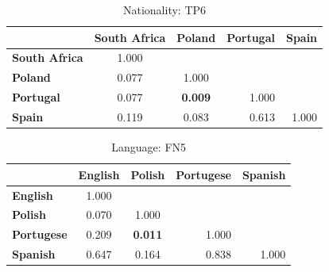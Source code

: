 \begin{table}
    \small
    \centering
    \begin{tabular}{lcccc}
        \toprule
                              & \multicolumn{1}{l}{\textbf{South Africa}} & \multicolumn{1}{l}{\textbf{Poland}}    & \textbf{Portugal}         & \textbf{Spain}            \\
        \midrule
        \textbf{South Africa} & 1.000                                     & \multicolumn{1}{l}{}                   &                           &                           \\
        \textbf{Poland}       & 0.077                                     & 1.000                                  &                           &                           \\
        \textbf{Portugal}     & 0.077                                     & \cellcolor[HTML]{EFEFEF}\textbf{0.009} & \multicolumn{1}{r}{1.000} &                           \\
        \textbf{Spain}        & 0.119                                     & 0.083                                  & \multicolumn{1}{r}{0.613} & \multicolumn{1}{r}{1.000} \\
        \bottomrule
    \end{tabular}
    \caption{Nationality: TP6}
\end{table}


\begin{table}
    \small
    \centering
    \begin{tabular}{lcccc}
        \toprule
                           & \multicolumn{1}{l}{\textbf{English}} & \multicolumn{1}{l}{\textbf{Polish}}    & \textbf{Portugese}        & \textbf{Spanish}          \\
        \midrule
        \textbf{English}   & 1.000                                & \multicolumn{1}{l}{}                   &                           &                           \\
        \textbf{Polish}    & 0.070                                & 1.000                                  &                           &                           \\
        \textbf{Portugese} & 0.209                                & \cellcolor[HTML]{EFEFEF}\textbf{0.011} & \multicolumn{1}{r}{1.000} &                           \\
        \textbf{Spanish}   & 0.647                                & 0.164                                  & \multicolumn{1}{r}{0.838} & \multicolumn{1}{r}{1.000} \\
        \bottomrule
    \end{tabular}
    \caption{Language: FN5}
\end{table}


